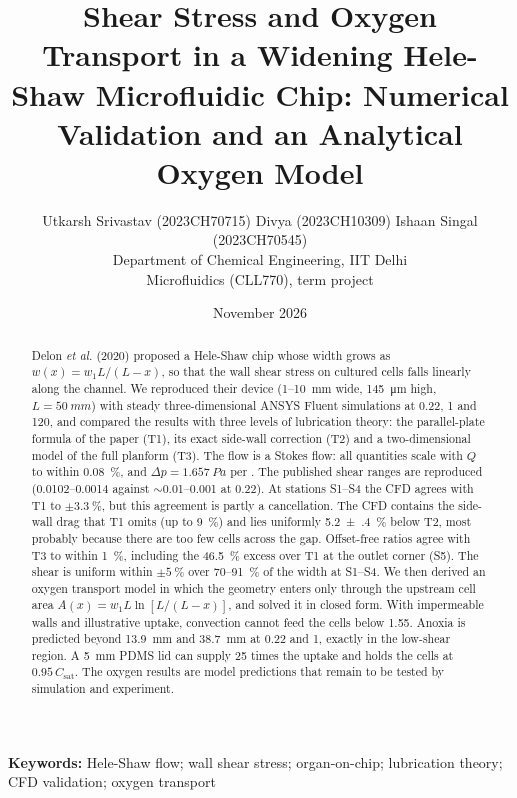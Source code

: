 \documentclass[11pt,a4paper]{article}
\title{\vspace{-8mm}\textbf{Shear Stress and Oxygen Transport in a Widening Hele-Shaw Microfluidic Chip: Numerical Validation and an Analytical Oxygen Model}}
\author{Utkarsh Srivastav (2023CH70715) \quad Divya (2023CH10309) \quad Ishaan Singal (2023CH70545)\\[1mm]
\small Department of Chemical Engineering, IIT Delhi\\
\small Microfluidics (CLL770), term project}
\date{\small November 2026}
\newcommand{\ulmin}{\si{\uLmin}}
\newcommand{\Csat}{C_{\mathrm{sat}}}
\begin{document}
\maketitle
\thispagestyle{fancy}

\begin{abstract}
\noindent
Delon \emph{et al.} (2020) proposed a Hele-Shaw chip whose width grows as $w(x)=w_1L/(L-x)$, so that the wall shear stress on cultured cells falls linearly along the channel. We reproduced their device (\SI{1}{}--\SI{10}{mm} wide, \SI{145}{\micro\metre} high, $L=\SI{50}{mm}$) with steady three-dimensional ANSYS Fluent simulations at 0.22, 1 and \SI{120}{\uLmin}, and compared the results with three levels of lubrication theory: the parallel-plate formula of the paper (T1), its exact side-wall correction (T2) and a two-dimensional model of the full planform (T3). The flow is a Stokes flow: all quantities scale with $Q$ to within \SI{0.08}{\percent}, and $\Delta p=\SI{1.657}{Pa}$ per \ulmin. The published shear ranges are reproduced (\SIrange{0.0102}{0.0014}{\dyncm} against $\sim$\SIrange{0.01}{0.001}{\dyncm} at \SI{0.22}{\uLmin}). At stations S1--S4 the CFD agrees with T1 to $\pm\SI{3.3}{\percent}$, but this agreement is partly a cancellation. The CFD contains the side-wall drag that T1 omits (up to \SI{+9}{\percent}) and lies uniformly \SI{5.2(4)}{\percent} below T2, most probably because there are too few cells across the gap. Offset-free ratios agree with T3 to within \SI{1}{\percent}, including the \SI{+46.5}{\percent} excess over T1 at the outlet corner (S5). The shear is uniform within $\pm\SI{5}{\percent}$ over \SI{70}{}--\SI{91}{\percent} of the width at S1--S4. We then derived an oxygen transport model in which the geometry enters only through the upstream cell area $A(x)=w_1L\ln[L/(L-x)]$, and solved it in closed form. With impermeable walls and illustrative uptake, convection cannot feed the cells below \SI{1.55}{\uLmin}. Anoxia is predicted beyond \SI{13.9}{mm} and \SI{38.7}{mm} at 0.22 and \SI{1}{\uLmin}, exactly in the low-shear region. A \SI{5}{mm} PDMS lid can supply 25 times the uptake and holds the cells at $0.95\,\Csat$. The oxygen results are model predictions that remain to be tested by simulation and experiment.
\end{abstract}

\noindent\textbf{Keywords:} Hele-Shaw flow; wall shear stress; organ-on-chip; lubrication theory; CFD validation; oxygen transport
\end{document}

